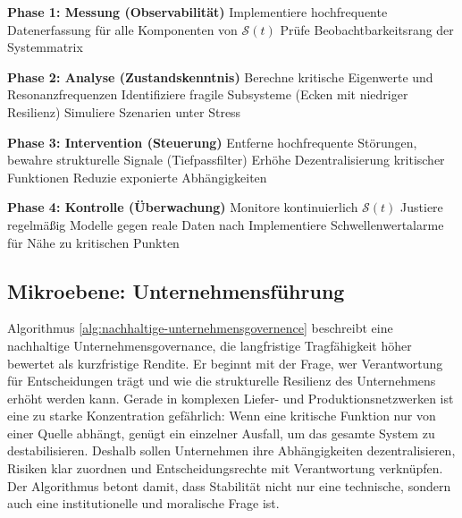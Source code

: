 \documentclass[a4paper, 12pt, twoside, openright]{report}
\theoremstyle{definition}
\theoremstyle{definition}
\begin{document}
\begin{algorithm}
\caption{Stabile Wirtschaftspolitik}
\label{alg:stabile-wirtschaftspolitik}
\begin{algorithmic}[1]
\item[] \textbf{Phase 1: Messung (Observabilität)}
\State Implementiere hochfrequente Datenerfassung für alle Komponenten von $\mathcal{S}(t)$
\State Prüfe Beobachtbarkeitsrang der Systemmatrix

\item[] \textbf{Phase 2: Analyse (Zustandskenntnis)}
\State Berechne kritische Eigenwerte und Resonanzfrequenzen
\State Identifiziere fragile Subsysteme (Ecken mit niedriger Resilienz)
\State Simuliere Szenarien unter Stress

\item[] \textbf{Phase 3: Intervention (Steuerung)}
\State Entferne hochfrequente Störungen, bewahre strukturelle Signale (Tiefpassfilter)
\State Erhöhe Dezentralisierung kritischer Funktionen
\State Reduzie exponierte Abhängigkeiten

\item[] \textbf{Phase 4: Kontrolle (Überwachung)}
\State Monitore kontinuierlich $\mathcal{S}(t)$
\State Justiere regelmäßig Modelle gegen reale Daten nach
\State Implementiere Schwellenwertalarme für Nähe zu kritischen Punkten
\end{algorithmic}
\end{algorithm}

\subsection{Mikroebene: Unternehmensführung}

Algorithmus \ref{alg:nachhaltige-unternehmensgovernence} beschreibt eine nachhaltige Unternehmensgovernance, die langfristige Tragfähigkeit höher bewertet als kurzfristige Rendite. Er beginnt mit der Frage, wer Verantwortung für Entscheidungen trägt und wie die strukturelle Resilienz des Unternehmens erhöht werden kann. Gerade in komplexen Liefer- und Produktionsnetzwerken ist eine zu starke Konzentration gefährlich: Wenn eine kritische Funktion nur von einer Quelle abhängt, genügt ein einzelner Ausfall, um das gesamte System zu destabilisieren. Deshalb sollen Unternehmen ihre Abhängigkeiten dezentralisieren, Risiken klar zuordnen und Entscheidungsrechte mit Verantwortung verknüpfen. Der Algorithmus betont damit, dass Stabilität nicht nur eine technische, sondern auch eine institutionelle und moralische Frage ist.
\end{document}
